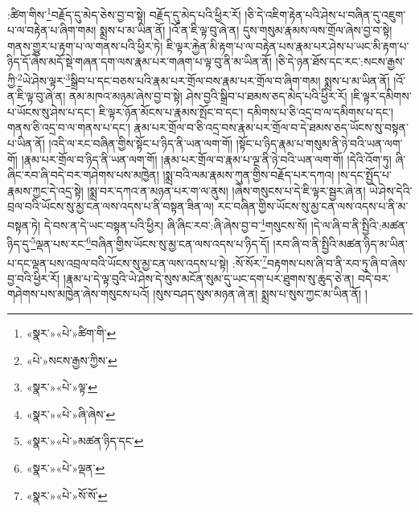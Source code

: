 :ཚིག་གིས་\footnote{«སྣར་»«པེ་»ཚིག་གི་}བརྗོད་དུ་མེད་ཅེས་བྱ་བ་སྟེ། བརྗོད་དུ་མེད་པའི་ཕྱིར་རོ། །ཅི་དེ་འཇིག་རྟེན་པའི་ཤེས་པ་བཞིན་དུ་འཇུག་པ་ལ་བརྟེན་པ་ཞིག་གམ། སྨྲས་པ་མ་ཡིན་ནོ། །འོ་ན་ཇི་ལྟ་བུ་ཞེ་ན། དུས་གསུམ་རྣམས་ལས་གྲོལ་ཞེས་བྱ་བ་སྟེ། གནས་གྱུར་པ་རྟག་པ་ལ་གནས་པའི་ཕྱིར་ཏེ། ཇི་ལྟར་རྐྱེན་མི་རྟག་པ་ལ་བརྟེན་པས་རྣམ་པར་ཤེས་པ་ཡང་མི་རྟག་པ་ཉིད་དོ་ཞེས་མདོ་སྡེ་གཞན་དག་ལས་རྣམ་པར་གཞག་པ་ལྟ་བུ་ནི་མ་ཡིན་ནོ། །ཅི་དེ་ཉན་ཐོས་དང་རང་:སངས་རྒྱས་ཀྱི་\footnote{«པེ་»སངས་རྒྱས་ཀྱིས་}ཡེ་ཤེས་ལྟར་\footnote{«སྣར་»«པེ་»ལྟ་}སྒྲིབ་པ་དང་བཅས་པའི་རྣམ་པར་གྲོལ་བས་རྣམ་པར་གྲོལ་བ་ཞིག་གམ། སྨྲས་པ་མ་ཡིན་ནོ། །འོ་ན་ཇི་ལྟ་བུ་ཞེ་ན། ནམ་མཁའ་མཉམ་ཞེས་བྱ་བ་སྟེ། ཤེས་བྱའི་སྒྲིབ་པ་ཐམས་ཅད་མེད་པའི་ཕྱིར་རོ། །ཇི་ལྟར་དམིགས་པ་ཡོངས་སུ་ཤེས་པ་དང་། ཇི་ལྟར་ཉོན་མོངས་པ་རྣམས་སྤོང་བ་དང་། དམིགས་པ་ཅི་འདྲ་བ་ལ་དམིགས་པ་དང་། གནས་ཅི་འདྲ་བ་ལ་གནས་པ་དང་། རྣམ་པར་གྲོལ་བ་ཅི་འདྲ་བས་རྣམ་པར་གྲོལ་བ་དེ་ཐམས་ཅད་ཡོངས་སུ་བསྟན་པ་ཡིན་ནོ། །འདི་ལ་རང་བཞིན་གྱིས་སྟོང་པ་ཉིད་ནི་ཡན་ལག་གོ། །སྟོང་པ་ཉིད་རྣམ་པ་གསུམ་ནི་ཉེ་བའི་ཡན་ལག་གོ། །རྣམ་པར་གྲོལ་བ་ཉིད་ནི་ཡན་ལག་གོ། །རྣམ་པར་གྲོལ་བ་རྣམ་པ་ལྔ་ནི་ཉེ་བའི་ཡན་ལག་གོ། །དེའི་འོག་ཏུ། ཞི་ཞིང་རབ་ཞི་བདེ་བར་གཤེགས་པས་མཁྱེན། །སྨྲ་བའི་ལམ་རྣམས་ཀུན་གྱིས་བརྗོད་པར་དཀའ། །ས་དང་སྤྱོད་པ་རྣམས་ཀྱང་དེ་འདྲ་སྟེ། །སྨྲ་བར་དཀའ་ན་མཉན་པར་ག་ལ་ནུས། །ཞེས་གསུངས་པ་དེ་ཇི་ལྟར་སྦྱར་ཞེ་ན། ཡེ་ཤེས་དེའི་བྲལ་བའི་ཡོངས་སུ་མྱ་ངན་ལས་འདས་པ་ནི་བསྟན་ཟིན་ལ། རང་བཞིན་གྱིས་ཡོངས་སུ་མྱ་ངན་ལས་འདས་པ་ནི་མ་བསྟན་ཏེ། དེ་བས་ན་དེ་ཡང་བསྟན་པའི་ཕྱིར། ཞི་ཞིང་རབ་:ཞི་ཞེས་བྱ་བ་\footnote{«སྣར་»«པེ་»ཞི་ཞེས་}གསུངས་སོ། །དེ་ལ་ཞི་བ་ནི་སྤྱིའི་:མཚན་ཉིད་དུ་\footnote{«སྣར་»«པེ་»མཚན་ཉིད་དང་}ལྡན་པས་རང་\footnote{«སྣར་»«པེ་»ལྡན་}བཞིན་གྱིས་ཡོངས་སུ་མྱ་ངན་ལས་འདས་པ་ཉིད་དོ། །རབ་ཞི་བ་ནི་སྤྱིའི་མཚན་ཉིད་མ་ཡིན་པ་དང་ལྡན་པས་འབྲལ་བའི་ཡོངས་སུ་མྱ་ངན་ལས་འདས་པ་སྟེ། :སོ་སོར་\footnote{«སྣར་»«པེ་»སོ་སོ་}བརྟགས་པས་ཞི་བ་ནི་རབ་ཏུ་ཞི་བ་ཞེས་བྱ་བའི་ཕྱིར་རོ། །རྣམ་པ་དེ་ལྟ་བུའི་ཡེ་ཤེས་དེ་སུས་མངོན་སུམ་དུ་ཡང་དག་པར་ཐུགས་སུ་ཆུད་ཅེ་ན། བདེ་བར་གཤེགས་པས་མཁྱེན་ཞེས་གསུངས་པའོ། །སུས་བཤད་སུས་མཉན་ཞེ་ན། སྨྲས་པ་སུས་ཀྱང་མ་ཡིན་ནོ། །
